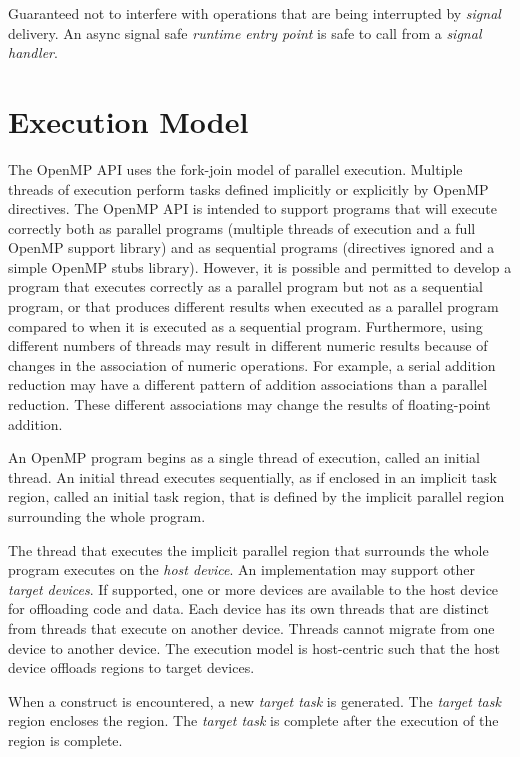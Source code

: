 \glossarydefstart
Guaranteed not to interfere with operations that are being interrupted by \emph{signal} delivery. 
An async signal safe \emph{runtime entry point} is safe to call from a \emph{signal handler}.
\glossarydefend



\section{Execution Model}
\label{sec:Execution Model}
The OpenMP API uses the fork-join model of parallel execution. Multiple threads of
execution perform tasks defined implicitly or explicitly by OpenMP directives. The
OpenMP API is intended to support programs that will execute correctly both as parallel
programs (multiple threads of execution and a full OpenMP support library) and as
sequential programs (directives ignored and a simple OpenMP stubs library). However,
it is possible and permitted to develop a program that executes correctly as a parallel
program but not as a sequential program, or that produces different results when 
executed as a parallel program compared to when it is executed as a sequential program. 
Furthermore, using different numbers of threads may result in different numeric results 
because of changes in the association of numeric operations. For example, a serial 
addition reduction may have a different pattern of addition associations than a parallel 
reduction. These different associations may change the results of floating-point addition.

An OpenMP program begins as a single thread of execution, called an initial thread. An 
initial thread executes sequentially, as if enclosed in an implicit task region, called an 
initial task region, that is defined by the implicit parallel region surrounding the whole 
program.

The thread that executes the implicit parallel region that surrounds the whole program 
executes on the \emph{host device}. An implementation may support 
other \emph{target devices}. If
supported, one or more devices are available to the host device for offloading code and 
data. Each device has its own threads that are distinct from threads that execute on 
another device. Threads cannot migrate from one device to another device. The 
execution model is host-centric such that the host device offloads  regions to
target devices.

When a  construct is encountered, a new \emph{target task} is generated.
The \emph{target task} region encloses the  region. The \emph{target task} is 
complete after the execution of the  region is complete.

